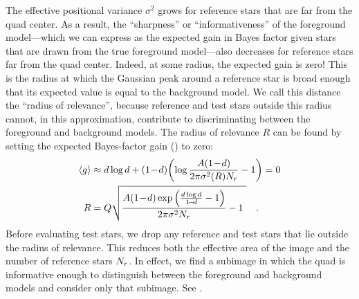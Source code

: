 The effective positional variance $\sigma^2$ grows for reference stars
that are far from the quad center.  As a result, the ``sharpness'' or
``informativeness'' of the foreground model---which we can express as
the expected gain in Bayes factor given stars that are drawn from the
true foreground model---also decreases for reference stars far from
the quad center.  Indeed, at some radius, the expected gain is zero!
This is the radius at which the Gaussian peak around a reference star
is broad enough that its expected value is equal to the background
model.  We call this distance the ``radius of relevance'', because
reference and test stars outside this radius cannot, in this
approximation, contribute to discriminating between the foreground and
background models.  The radius of relevance $R$ can be found by
setting the expected Bayes-factor gain () to zero:
\begin{align}
  \exgain &\approx
  d \log{d} + (\oneminusd)\biggl( \log{\frac{A (\oneminusd)}{2 \pi \sigma^2(R) \nref}} - 1 \biggr)
  = 0 \\
  R &= Q \sqrt{\frac{A (\oneminusd) \exp{\left( \frac{d \log d}{\oneminusd} - 1 \right)}}{2 \pi \sigma^2 \nref} - 1 \ }
  \quad .
  \label{eq:ror}
\end{align}
Before evaluating test stars, we drop any reference and test stars
that lie outside the radius of relevance.  This reduces both the
effective area of the image and the number of reference stars ${N_r}$.
In effect, we find a subimage in which the quad is informative enough
to distinguish between the foreground and background models and
consider only that subimage.  See .


